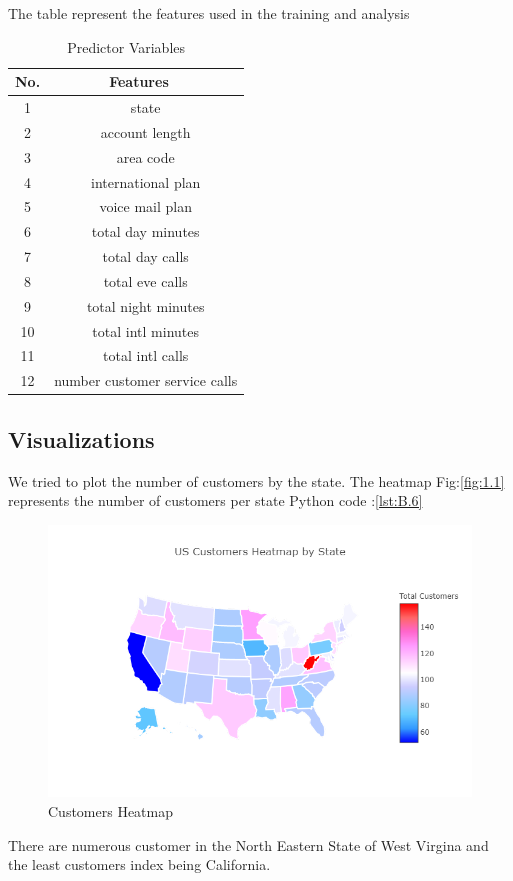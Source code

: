 \documentclass[a4paper,12pt]{report}
\begin{document}
\begin{table}[ht]
The table represent the features used in the training and analysis 
\caption{Predictor Variables } %
\centering %
\begin{tabular}{c c} %
\hline %
 No.  &  Features \ \\ [0.5ex] %
\hline %
1 & state \\ %
2 & account length  \\
3 & area code   \\
4 & international plan  \\
5 & voice mail plan  \\
6 & total day minutes  \\
7 &total day calls  \\
8 & total eve calls  \\
9 &total night minutes \\
10 & total intl minutes  \\
11 & total intl calls  \\
12 & number customer service calls \\ [1ex] %
\hline %
\end{tabular}
\label{table:nonlin} %
\end{table} 
\FloatBarrier
\subsection{Visualizations}
We tried to plot the number of customers by the state. The heatmap Fig:\ref{fig:1.1} represents the number of customers per state Python code :\ref{lst:B.6}\\
\begin{figure}[h]
\vspace{-4pt}
\center
\includegraphics[scale = 0.5]{customers.png}
\caption{Customers Heatmap}
\label{fig:1.2}
\end{figure}
There are numerous customer in the North Eastern State of West Virgina and the least customers index being California.
\end{document}
